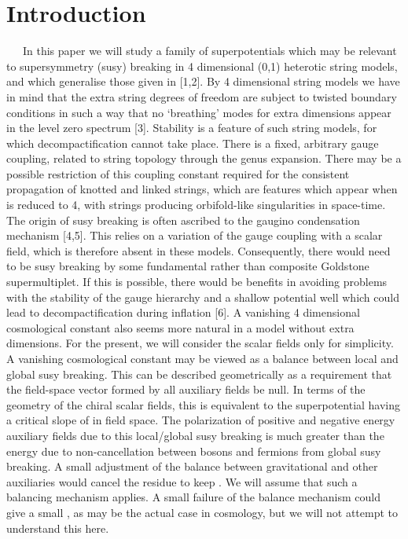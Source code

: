 \documentclass[a4paper,12pt]{article}
\begin{document}
\section{Introduction}
\ \ \ In this paper we will study a family of superpotentials
which may be relevant to supersymmetry (susy) breaking in 4
dimensional (0,1) heterotic string models, and which generalise
those given in [1,2]. By 4 dimensional string models we have in
mind that the extra string degrees of freedom are subject to
twisted boundary conditions in such a way that no `breathing'
modes for extra dimensions appear in the level zero spectrum [3].
Stability is a feature of such \coordHE{} string models, for which
decompactification cannot take place. There is a fixed, arbitrary
gauge coupling, related to string topology through the genus
expansion. There may be a possible restriction of this coupling
constant required for the consistent propagation of knotted and
linked strings, which are features which appear when \coordHE{} is
reduced to 4, with strings producing orbifold-like singularities
in space-time. The origin of susy breaking is often ascribed to
the gaugino condensation mechanism [4,5]. This relies on a
variation of the gauge coupling with a scalar field, which is
therefore absent in these models. Consequently, there would need
to be susy breaking by some fundamental rather than composite
Goldstone supermultiplet. If this is possible, there would be
benefits in avoiding problems with the stability of the gauge
hierarchy and a shallow potential well which could lead to
decompactification during inflation [6]. A vanishing 4 dimensional
cosmological constant also seems more natural in a model without
extra dimensions. For the present, we will consider the scalar
fields only for simplicity. A vanishing cosmological constant may
be viewed as a balance between local and global susy breaking.
This can be described geometrically as a requirement that the
field-space vector formed by all auxiliary fields be null. In
terms of the geometry of the chiral scalar fields, this is
equivalent to the superpotential \coordHE{} having a critical slope of
\coordHE{} in field space. The polarization of positive and
negative energy auxiliary fields due to this local/global susy
breaking is much greater than the energy due to non-cancellation
between bosons and fermions from global susy breaking. A small
adjustment of the balance between gravitational and other
auxiliaries would cancel the residue to keep \coordHE{}. We will
assume that such a balancing mechanism applies. A small failure of
the balance mechanism could give a small \myHighlight{$\Lambda$}\coordHE{}, as may be the
actual case in cosmology, but we will not attempt to understand
this here.
\end{document}
